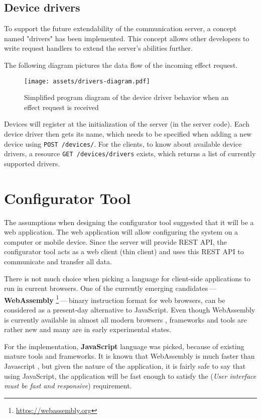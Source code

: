 \hypertarget{x-device-drivers}{\subsection{Device drivers}}
To support the future extendability of the communication server, a concept named
"drivers" has been implemented. This concept allows other developers to write
request handlers to extend the server’s abilities further.


The following diagram pictures the data flow of the incoming effect request.


\begin{figure}[h]{}
\centering\texttt{[image: assets/drivers-diagram.pdf]}
\caption{Simplified program diagram of the device driver behavior when an effect request is received}
\end{figure}

Devices will register at the initialization of the server (in the server code).
Each device driver then gets its name, which needs to be specified when adding a new
device using \texttt{POST /devices/}. For the clients, to know about available device
drivers, a resource \texttt{GET /devices/drivers} exists, which returns a list
of currently supported drivers.


\hypertarget{x-configurator-tool}{\section{Configurator Tool}}
The assumptions when designing the configurator tool suggested that it will
be a web application. The web application will allow configuring the system
on a computer or mobile device. Since the server will provide REST API,
the configurator tool acts as a
web client (thin client) and uses this REST API to communicate and transfer
all data.


There is not much choice when picking a language for client-side applications
to run in current browsers. One of the currently
emerging candidates — \textbf{WebAssembly} \footnote{\href{https://webassembly.org}{https://webassembly.org}} — binary instruction format for web browsers, can be considered as
a present-day alternative to JavaScript. Even though WebAssembly is
currently available in almost all modern browsers \cite{wasmroadmap}, frameworks
and tools are rather new and many are in early experimental states.


For the implementation, \textbf{JavaScript} language was picked, because
of existing mature tools and frameworks. It is known that WebAssembly
is much faster than Javascript \cite{wasmfast}, but given the nature of the
application, it is fairly safe to say that using JavaScript, the application
will be fast enough to satisfy the \hyperlink{./05-analysis}{}
(\emph{User interface must be fast and responsive})
requirement.


